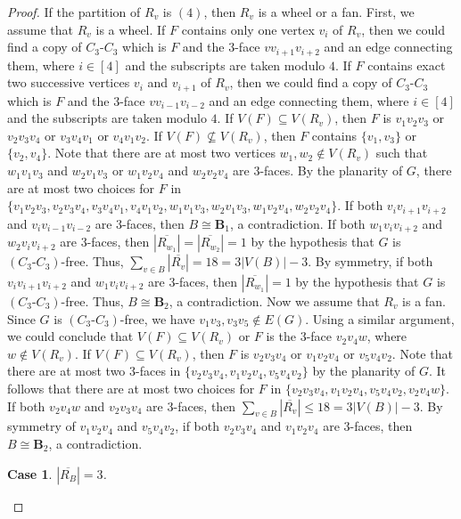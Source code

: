 \documentclass[12pt]{article}
\newtheorem{case}{Case}[section]
\begin{document}
\begin{proof}
    If the partition of $R_v$ is $(4)$, then $R_v$ is a wheel or a fan.
    First, we assume that $R_v$ is a wheel.
    If $F$ contains only one vertex $v_i$ of $R_v$, then we could find a copy of $C_3\textbf{-}C_3$ which is $F$ and the $3$-face $vv_{i+1}v_{i+2}$ and an edge connecting them, where $i\in[4]$ and the subscripts are taken modulo $4$.
    If $F$ contains exact two successive vertices $v_{i}$ and $v_{i+1}$ of $R_v$, then we could find a copy of $C_3\textbf{-}C_3$ which is $F$ and the $3$-face $vv_{i-1}v_{i-2}$ and an edge connecting them, where $i\in[4]$ and the subscripts are taken modulo $4$.
    If $V(F)\subseteq V(R_v)$, then $F$ is $v_1v_2v_3$ or $v_2v_3v_4$ or $v_3v_4v_1$ or $v_4v_1v_2$.
    If $V(F)\not \subseteq V(R_v)$, then $F$ contains $\{v_1, v_3\}$ or $\{v_2, v_4\}$.
    Note that there are at most two vertices $w_1,w_2\notin V(R_v)$ such that $w_1v_1v_{3}$ and $w_2v_1v_3$ or $w_1v_2v_4$ and $w_2v_2v_4$ are $3$-faces.
    By the planarity of $G$, there are at most two choices for $F$ in $\{v_1v_2v_3, v_2v_3v_4, v_3v_4v_1, v_4v_1v_2, w_1v_1v_{3}, w_2v_1v_3, w_1v_2v_4, w_2v_2v_4\}$.
    If both $v_{i}v_{i+1}v_{i+2}$ and $v_{i}v_{i-1}v_{i-2}$ are $3$-faces, then $B\cong\mathbf{B}_1$, a contradiction. 
    If both $w_1v_iv_{i+2}$ and $w_2v_iv_{i+2}$ are $3$-faces, then $|\overline{R_{w_1}}|=|\overline{R_{w_2}}|=1$ by the hypothesis that $G$ is $(C_3\textbf{-}C_3)$-free.
    Thus, $\sum_{v \in B}|\overline{R_v}| = 18 = 3|V(B)|-3$.
    By symmetry, if both $v_{i}v_{i+1}v_{i+2}$ and $w_1v_iv_{i+2}$ are $3$-faces, then $|\overline{R_{w_1}}|=1$ by the hypothesis that $G$ is $(C_3\textbf{-}C_3)$-free.
    Thus, $B\cong\mathbf{B}_2$, a contradiction.
    Now we assume that $R_v$ is a fan. Since $G$ is $(C_3\textbf{-}C_3)$-free, we have $v_1v_3,v_3v_5\notin E(G)$.
    Using a similar argument, we could conclude that $V(F)\subseteq V(R_v)$ or $F$ is the $3$-face $v_2v_4w$, where $w\notin V(R_v)$.
    If $V(F)\subseteq V(R_v)$, then $F$ is $v_2v_3v_4$ or $v_1v_2v_4$ or $v_5v_4v_2$. 
    Note that there are at most two $3$-faces in $\{v_2v_3v_4, v_1v_2v_4, v_5v_4v_2\}$ by the planarity of $G$.
    It follows that there are at most two choices for $F$ in $\{v_2v_3v_4, v_1v_2v_4, v_5v_4v_2, v_2v_4w\}$.
    If both $v_2v_4w$ and $v_2v_3v_4$ are $3$-faces, then $\sum_{v \in B}|\overline{R_v}| \leq 18=3|V(B)|-3$.
    By symmetry of $v_1v_2v_4$ and $v_5v_4v_2$, if both $v_2v_3v_4$ and $v_1v_2v_4$ are $3$-faces, then $B\cong\mathbf{B}_2$, a contradiction. 

    \begin{case}
        $|\overline{R_B}| = 3$. 
    \end{case}


\end{proof}
\end{document}
